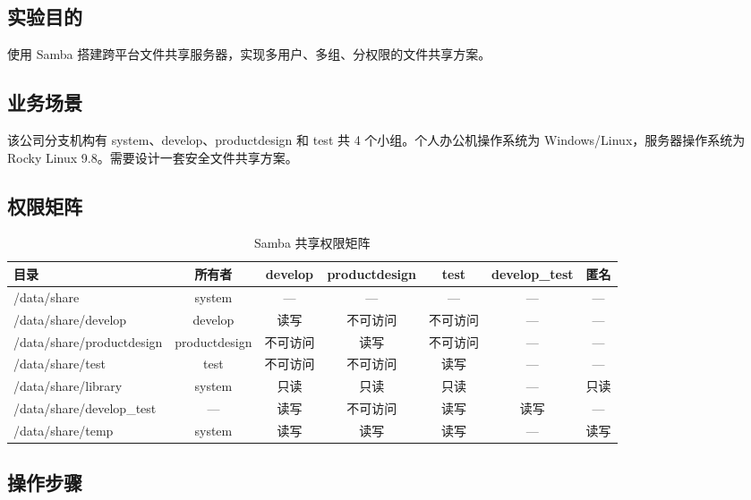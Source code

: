 \documentclass[12pt,a4paper]{ctexart}
\begin{document}
\subsection{实验目的}

使用 Samba 搭建跨平台文件共享服务器，实现多用户、多组、分权限的文件共享方案。

\subsection{业务场景}

该公司分支机构有 system、develop、productdesign 和 test 共 4 个小组。个人办公机操作系统为 Windows/Linux，服务器操作系统为 Rocky Linux 9.8。需要设计一套安全文件共享方案。

\subsection{权限矩阵}

\bgroup\small
\begin{table}[h]
\centering
\begin{tabular}{lcccccc}
\toprule
目录        & 所有者 & develop & productdesign & test & develop\_test & 匿名 \\
\midrule
/data/share      & system    & ---      & ---           & ---  & ---   & --- \\
/data/share/develop & develop  & 读写     & 不可访问       & 不可访问 & --- & --- \\
/data/share/productdesign & productdesign & 不可访问 & 读写   & 不可访问 & ---   & --- \\
/data/share/test & test      & 不可访问  & 不可访问        & 读写   & ---   & --- \\
/data/share/library & system  & 只读     & 只读          & 只读   & ---   & 只读 \\
/data/share/develop\_test & --- & 读写    & 不可访问        & 读写   & 读写   & --- \\
/data/share/temp & system    & 读写     & 读写          & 读写   & ---   & 读写 \\
\bottomrule
\end{tabular}
\caption{Samba 共享权限矩阵}
\end{table}
\egroup

\subsection{操作步骤}
\end{document}
